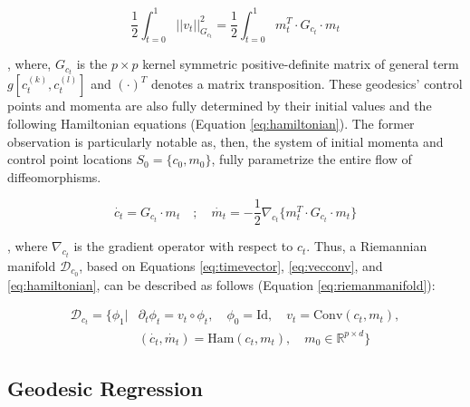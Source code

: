 		\begin{equation}
			\frac{1}{2} \int_{t=0}^{1} \vert\vert v_{t} \vert\vert_{G_{c_{t}}}^{2} = \frac{1}{2} \int_{t=0}^{1} m_{t}^{T} \cdot G_{c_{t}} \cdot m_{t}
			\label{eq:defenergy}
		\end{equation}
		
		, where, $G_{c_{t}}$ is the $p \times p $ kernel symmetric positive-definite matrix of general term $g[c_{t}^{(k)}, c_{t}^{(l)}]$ and $(\cdot)^{T}$ denotes a matrix transposition. These geodesics' control points and momenta are also fully determined by their initial values and the following Hamiltonian equations (Equation \ref{eq:hamiltonian}). The former observation is particularly notable as, then, the system of initial momenta and control point locations $S_{0} = \{ c_{0}, m_{0}\}$, fully parametrize the entire flow of diffeomorphisms. 
		
		\begin{equation}
			\dot{c_{t}} = G_{c_{t}} \cdot m_{t}  \quad ; \quad \dot{m_{t}} = -\frac{1}{2} \nabla_{c_{t}} \{  m_{t}^{T} \cdot G_{c_{t}} \cdot m_{t}   \} 
			\label{eq:hamiltonian}
		\end{equation}	
		
		, where $\nabla_{c_{t}}$ is the gradient operator with respect to $c_{t}$. Thus, a Riemannian manifold $\mathscr{D}_{c_{0}}$, based on Equations \ref{eq:timevector}, \ref{eq:vecconv}, and \ref{eq:hamiltonian}, can be described as follows (Equation \ref{eq:riemanmanifold}): 
				
		\begin{equation}
			\begin{aligned}
			\mathscr{D}_{c_{t}} = \{ \phi_{1} \vert &\partial_{t}\phi_{t} = v_{t} \circ \phi_{t}, \quad \phi_{0} = \mathrm{Id}, \quad v_{t} = \mathrm{Conv}(c_{t}, m_{t}), \\
			&(\dot{c_{t}}, \dot{m_{t}}) = \mathrm{Ham} (c_{t}, m_{t}), \quad m_{0} \in \mathbb{R}^{p \times d}  \}
			\end{aligned}
			\label{eq:riemanmanifold}
		\end{equation}

		\subsection{Geodesic Regression}
			
